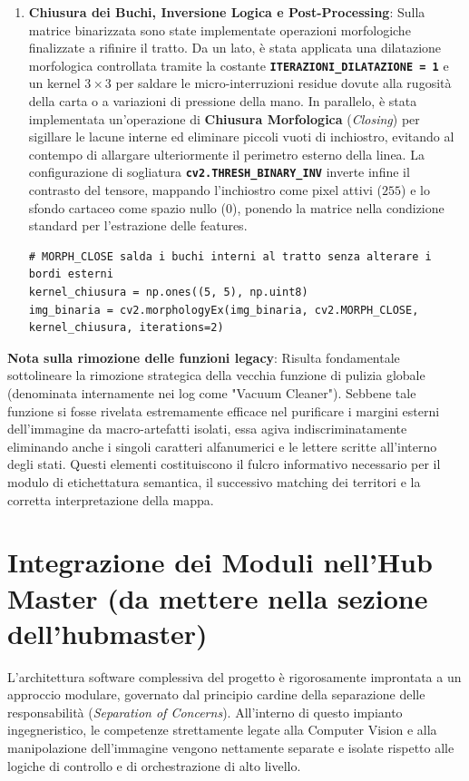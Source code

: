 \documentclass[12pt,a4paper]{article}
\begin{document}
\begin{enumerate}
    \item \textbf{Chiusura dei Buchi, Inversione Logica e Post-Processing}: Sulla matrice binarizzata sono state implementate operazioni morfologiche finalizzate a rifinire il tratto. Da un lato, è stata applicata una dilatazione morfologica controllata tramite la costante \textbf{\texttt{ITERAZIONI\_DILATAZIONE = 1}} e un kernel $3 \times 3$ per saldare le micro-interruzioni residue dovute alla rugosità della carta o a variazioni di pressione della mano. In parallelo, è stata implementata un'operazione di \textbf{Chiusura Morfologica} (\textit{Closing}) per sigillare le lacune interne ed eliminare piccoli vuoti di inchiostro, evitando al contempo di allargare ulteriormente il perimetro esterno della linea. La configurazione di sogliatura \textbf{\texttt{cv2.THRESH\_BINARY\_INV}} inverte infine il contrasto del tensore, mappando l'inchiostro come pixel attivi ($255$) e lo sfondo cartaceo come spazio nullo ($0$), ponendo la matrice nella condizione standard per l'estrazione delle features.
    \begin{lstlisting}[style=vscode-esatto, caption={Applicazione della chiusura morfologica per la sigillatura dei vuoti interni.}]
# MORPH_CLOSE salda i buchi interni al tratto senza alterare i bordi esterni
kernel_chiusura = np.ones((5, 5), np.uint8)
img_binaria = cv2.morphologyEx(img_binaria, cv2.MORPH_CLOSE, kernel_chiusura, iterations=2)
    \end{lstlisting}
    \end{enumerate}

    \textbf{Nota sulla rimozione delle funzioni legacy}: Risulta fondamentale sottolineare la rimozione strategica della vecchia funzione di pulizia globale (denominata internamente nei log come "Vacuum Cleaner"). Sebbene tale funzione si fosse rivelata estremamente efficace nel purificare i margini esterni dell'immagine da macro-artefatti isolati, essa agiva indiscriminatamente eliminando anche i singoli caratteri alfanumerici e le lettere scritte all'interno degli stati. Questi elementi costituiscono il fulcro informativo necessario per il modulo di etichettatura semantica, il successivo matching dei territori e la corretta interpretazione della mappa.

    \section{Integrazione dei Moduli nell'Hub Master  (da mettere nella sezione dell'hubmaster)}
    L'architettura software complessiva del progetto è rigorosamente improntata a un approccio modulare, governato dal principio cardine della separazione delle responsabilità (\textit{Separation of Concerns}). All'interno di questo impianto ingegneristico, le competenze strettamente legate alla Computer Vision e alla manipolazione dell'immagine vengono nettamente separate e isolate rispetto alle logiche di controllo e di orchestrazione di alto livello.
\end{document}
